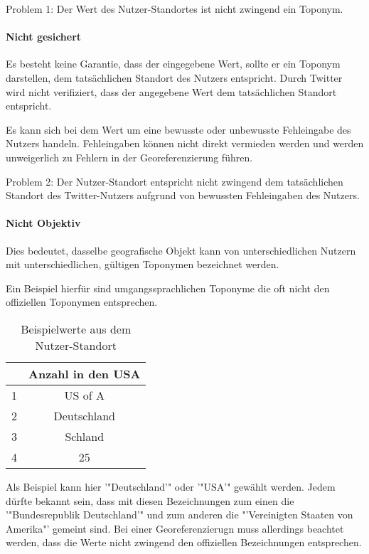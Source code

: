 				Problem 1: Der Wert des Nutzer-Standortes ist nicht zwingend ein Toponym.

			\paragraph{Nicht gesichert} 

				Es besteht keine Garantie, dass der eingegebene Wert, sollte er ein Toponym darstellen, dem tatsächlichen Standort des Nutzers entspricht. 
				Durch Twitter wird nicht verifiziert, dass der angegebene Wert dem tatsächlichen Standort entspricht.
				
				Es kann sich bei dem Wert um eine bewusste oder unbewusste Fehleingabe des Nutzers handeln.
				Fehleingaben können nicht direkt vermieden werden und werden unweigerlich zu Fehlern in der Georeferenzierung führen. 

				Problem 2: Der Nutzer-Standort entspricht nicht zwingend dem tatsächlichen Standort des Twitter-Nutzers aufgrund von bewussten Fehleingaben des Nutzers.

			\paragraph{Nicht Objektiv} 

				Dies bedeutet, dasselbe geografische Objekt kann von unterschiedlichen Nutzern mit unterschiedlichen, gültigen Toponymen bezeichnet werden. 

				Ein Beispiel hierfür sind umgangssprachlichen Toponyme die oft nicht den offiziellen Toponymen entsprechen. 
				
				\begin{table}[htpb]
					\caption{Beispielwerte aus dem Nutzer-Standort} 
					\centering
					\begin{tabular}{|c|c|}
						\hline
						 & Anzahl in den USA \\
						\hline\hline
						1 & US of A \\
						\hline
						2 & Deutschland \\
						\hline
						3 & Schland \\
						\hline
						4 & 25 \\
						\hline
					\end{tabular}
					\label{tab:usCitiesGermanNames} 
				\end{table}

				Als Beispiel kann hier '"Deutschland'" oder '"USA'" gewählt werden. 
				Jedem dürfte bekannt sein, dass mit diesen Bezeichnungen zum einen die '"Bundesrepublik Deutschland'" und zum anderen die "'Vereinigten Staaten von Amerika"' gemeint sind. 
				Bei einer Georeferenzierugn muss allerdings beachtet werden, dass die Werte nicht zwingend den offiziellen Bezeichnungen entsprechen.

